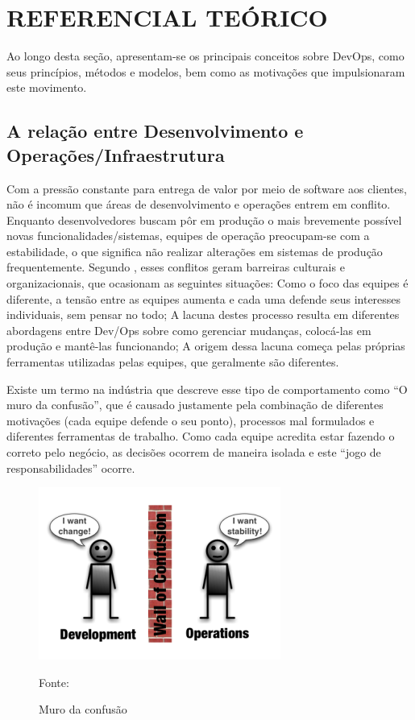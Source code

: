 \documentclass[twoside,english,brazilian]{UNISINOSartigo}
\newcommand{\source}[1]{\caption*{Fonte: {#1}} }
\begin{document}
\section{REFERENCIAL TEÓRICO}

Ao longo desta seção, apresentam-se os principais conceitos sobre DevOps, como seus princípios, métodos e modelos, bem como as motivações que impulsionaram este movimento.

\subsection{A relação entre Desenvolvimento  e Operações/Infraestrutura}
Com a pressão constante para entrega de valor por meio de software aos clientes, não é incomum que áreas de desenvolvimento e operações entrem em conflito. Enquanto desenvolvedores buscam pôr em produção o mais brevemente possível novas funcionalidades/sistemas, equipes de operação preocupam-se com a estabilidade, o que significa não realizar alterações em sistemas de produção frequentemente.
Segundo , esses conflitos geram barreiras culturais e organizacionais, que ocasionam as seguintes situações:
Como o foco das equipes é diferente, a tensão entre as equipes aumenta e cada uma defende seus interesses individuais, sem pensar no todo; A lacuna destes processo resulta em diferentes abordagens entre Dev/Ops sobre como gerenciar mudanças, colocá-las em produção e mantê-las funcionando; A origem dessa lacuna começa pelas próprias ferramentas utilizadas pelas equipes, que geralmente são diferentes.

Existe um termo na indústria que descreve esse tipo de comportamento como ``O muro da confusão'', que é causado justamente pela combinação de diferentes motivações (cada equipe defende o seu ponto), processos mal formulados e diferentes ferramentas de trabalho. Como cada equipe acredita estar fazendo o correto pelo negócio, as decisões ocorrem de maneira isolada e este ``jogo de responsabilidades'' ocorre.

\begin{figure}[h!]
    \centering
        \caption{Muro da confusão}
    \includegraphics[scale=.8]{imagens/WallOfConfusion.png}
    \source{}
    \label{fig:Muro da confusão}
    \end{figure}
\end{document}
